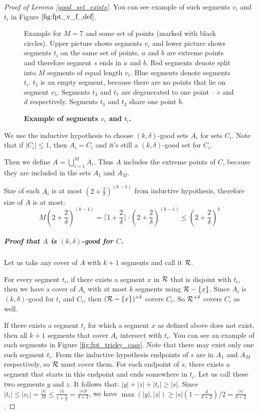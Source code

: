\begin{proof}[Proof of Lemma \ref{good_set_exists}]
You can see example of such segments $v_i$ and $t_i$ in Figure $\ref{fig:fpt_v_f_def}$.

\begin{figure}[h]
\def\svgwidth{\columnwidth}

\caption{\textbf{Example of segments $v_i$ and $t_i$.}}
Example for $M = 7$ and some set of points (marked with black circles).
Upper picture shows segments $v_i$ and lower picture shows segments $t_i$
on the same set of points.
$a$ and $b$ are extreme points and therefore segment $s$
ends in $a$ and $b$.
Red segments denote split into $M$ segments of equal length $v_i$.
Blue segments denote segments $t_i$. $t_5$ is an empty segment,
because there are no points that lie on segment $v_5$.
Segments $t_3$ and $t_7$ are degenerated to one point --
$c$ and $d$ respectively.
Segments $t_1$ and $t_2$ share one point $b$.
\label{fig:fpt_v_f_def}
\end{figure}

We use the inductive hypothesis to choose $(k, \delta)$-good sets $A_i$
for sets $C_i$. Note that if $|C_i| \le 1$, then $A_i = C_i$
and it's still a $(k, \delta)$-good set for $C_i$.

Then we define $A = \bigcup_{i=1}^{M} A_i$.
Thus $A$ includes the extreme points of $C$,
because they are included in the sets $A_1$ and $A_M$.

Size of each $A_i$ is at most $(2+\frac{2}{\delta})^(k-1)$ from inductive
hypothesis, therefore size of $A$ is at most:
$$M(2+\frac{2}{\delta})^{(k-1)} =
\lceil1+\frac{2}{\delta}\rceil\cdot(2+\frac{2}{\delta})^{(k-1)}
\le (2+\frac{2}{\delta})^k$$


\subparagraph{Proof that $A$ is $(k, \delta)$-good for $C$.}
Let us take any cover of $A$ with $k+1$ segments and call it $\mathcal{R}$.

For every segment $t_i$, if there exists a segment $x$ in $\mathcal{R}$ 
that is disjoint with $t_i$,
then we have a cover of $A_i$ with at most $k$
segments using $\mathcal{R} - \{x\}$.
Since $A_i$ is $(k, \delta)$-good for $t_i$ and $C_i$,
then $(\mathcal{R} - \{x\})^{+\delta}$ covers $C_i$.
So $\mathcal{R}^{+\delta}$ covers $C_i$ as well.

If there exists a segment $t_i$ for which a segment $x$ as defined above
does not exist, then all $k+1$ segments that cover
$A_i$ intersect with $t_i$.
You can see an example of such segments in Figure \ref{fig:fpt_tricky_case}.
Note that there may exist only one such segment $t_i$.
From the inductive hypothesis endpoints of $s$ are
in $A_1$ and $A_M$ respectively, so $\mathcal{R}$ must cover them.
For each endpoint of $s$, there exists
a segment that starts in this endpoint and ends somewhere in $t_i$.
Let us call these two segments $y$ and $z$. It follows that:
$|y| + |z| + |t_i| \ge |s|$.
Since $|t_i| \le |v_i| = \frac{|s|}{M} \le \frac{|s|}{1+\frac{2}{\delta}} = \frac{|s|\delta}{\delta+2}$,
we have $\max(|y|, |z|) \ge |s|(1-\frac{\delta}{\delta+2})/2 = \frac{|s|}{\delta+2}$.


\end{proof}
